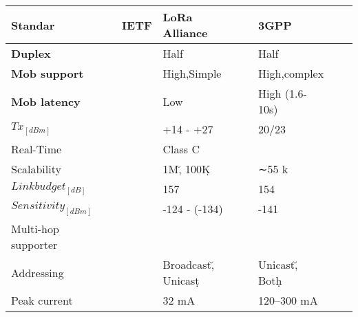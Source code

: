 \begin{longtable}{l|l|l|l|l|l|l|l}
	\bf{Standar}                         &                  & IETF         & LoRa	Alliance          &               & 3GPP                                   &                   & \\\hline
	\bf{Duplex}                          &                  &              & Half                   &               & Half                                   &                   & \\\hline
	\bf{Mob support}           		     &                  &              & High,Simple            &               & High,complex                       &                   & \\\hline
	\bf{Mob latency}            		 &                  &              & Low                    &               & High (1.6-10s)                      &                   & \\\hline
	\bf{$Tx_{[dBm]}$}                    &                  &              & +14 - +27              &               & 20/23                                  &                   & \\\hline
	Real-Time                            &                  &              & Class C                &               & \ko                                    &                   & \\\hline
	Scalability                          &                  &              & 1M\u, 100K\d           &               & ∼55 k                                  &                   & \\\hline
	$Link budget_{[dB]}$                 &                  &              & 157                    &               & 154                                    &                   & \\\hline
	$Sensitivity_{[dBm]}$                &                  &              & -124 - (-134)          &               & -141                                   &                   & \\\hline
	Multi-hop supporter                  &                  &              & \ko                    &               & \ko                                    &                   & \\\hline
	Addressing                           &                  &              & Broadcast\u, Unicast\d &               & Unicast\u, Both\d                      &                   & \\\hline
	Peak current                         &                  &              & 32 mA                  &               & 120–300 mA                             &                   & \\\hline

\end{longtable}
